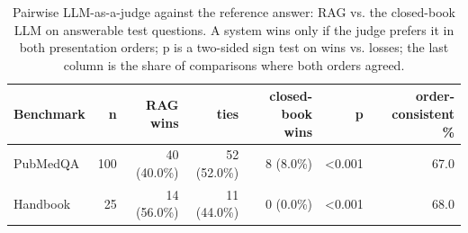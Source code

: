 \begin{table}[t]
\centering\small
\begin{tabular}{lrrrrrr}
\toprule
Benchmark & n & RAG wins & ties & closed-book wins & p & order-consistent \% \\
\midrule
PubMedQA & 100 & 40 (40.0\%) & 52 (52.0\%) & 8 (8.0\%) & <0.001 & 67.0 \\
Handbook & 25 & 14 (56.0\%) & 11 (44.0\%) & 0 (0.0\%) & <0.001 & 68.0 \\
\bottomrule
\end{tabular}
\caption{Pairwise LLM-as-a-judge against the reference answer: RAG vs. the closed-book LLM on answerable test questions. A system wins only if the judge prefers it in both presentation orders; p is a two-sided sign test on wins vs. losses; the last column is the share of comparisons where both orders agreed.}
\label{tab:judge}
\end{table}
